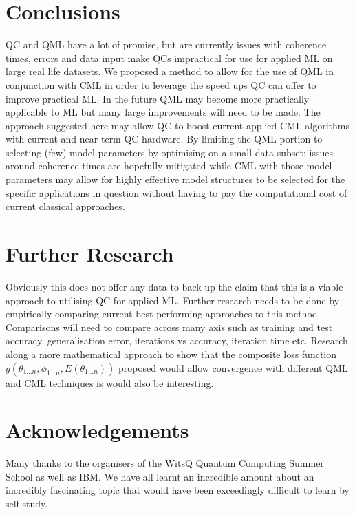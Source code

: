\documentclass[a0,portrait]{a0poster}
\begin{document}
\begin{multicols}{2}
\section*{Conclusions}
QC and QML have a lot of promise, but are currently issues with coherence times, errors and data input make QCs impractical for use for applied ML on large real life datasets. We proposed a method to allow for the use of QML in conjunction with CML in order to leverage the speed ups QC can offer to improve practical ML. In the future QML may become more practically applicable to ML but many large improvements will need to be made. The approach suggested here may allow QC to boost current applied CML algorithms with current and near term QC hardware. By limiting the QML portion to selecting (few) model parameters by optimising on a small data subset; issues around coherence times are hopefully mitigated while CML with those model parameters may allow for highly effective model structures to be selected for the specific applications in question without having to pay the computational cost of current classical approaches.
\color{DarkSlateGray} %
\section*{Further Research}
Obviously this does not offer any data to back up the claim that this is a viable approach to utilising QC for applied ML. Further research needs to be done by empirically comparing current best performing approaches to this method. Comparisons will need to compare across many axis such as training and test accuracy, generalisation error, iterations vs accuracy, iteration time etc. Research along a more mathematical approach to show that the composite loss function $g(\theta_{1...n}, \phi_{1...n}, E(\theta_{1...n}) )$ proposed would allow convergence with different QML and CML techniques is would also be interesting.
\section*{Acknowledgements}
Many thanks to the organisers of the WitsQ Quantum Computing Summer School as well as IBM. We have all learnt an incredible amount about an incredibly fascinating topic that would have been exceedingly difficult to learn by self study. 
\end{multicols}
\end{document}
